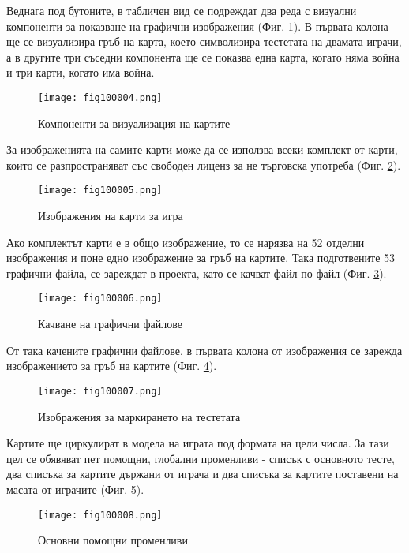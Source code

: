 Веднага под бутоните, в табличен вид се подреждат два реда с визуални компоненти за показване на графични изображения (Фиг. \ref{fig100004}). В първата колона ще се визуализира гръб на карта, което символизира тестетата на двамата играчи, а в другите три съседни компонента ще се показва една карта, когато няма война и три карти, когато има война. 

\begin{figure}[H]
  \centering
  \texttt{[image: fig100004.png]}
  \caption{Компоненти за визуализация на картите}
\label{fig100004}
\end{figure}

За изображенията на самите карти може да се използва всеки комплект от карти, които се разпространяват със свободен лиценз за не търговска употреба (Фиг. \ref{fig100005}).

\begin{figure}[H]
  \centering
  \texttt{[image: fig100005.png]}
  \caption{Изображения на карти за игра}
\label{fig100005}
\end{figure}

Ако комплектът карти е в общо изображение, то се нарязва на 52 отделни изображения и поне едно изображение за гръб на картите. Така подготвените 53 графични файла, се зареждат в проекта, като се качват файл по файл (Фиг. \ref{fig100006}).

\begin{figure}[H]
  \centering
  \texttt{[image: fig100006.png]}
  \caption{Качване на графични файлове}
\label{fig100006}
\end{figure}

От така качените графични файлове, в първата колона от изображения се зарежда изображението за гръб на картите (Фиг. \ref{fig100007}).

\begin{figure}[H]
  \centering
  \texttt{[image: fig100007.png]}
  \caption{Изображения за маркирането на тестетата}
\label{fig100007}
\end{figure}

Картите ще циркулират в модела на играта под формата на цели числа. За тази цел се обявяват пет помощни, глобални променливи - списък с основното тесте, два списъка за картите държани от играча и два списъка за картите поставени на масата от играчите (Фиг. \ref{fig100008}). 

\begin{figure}[H]
  \centering
  \texttt{[image: fig100008.png]}
  \caption{Основни помощни променливи}
\label{fig100008}
\end{figure}


